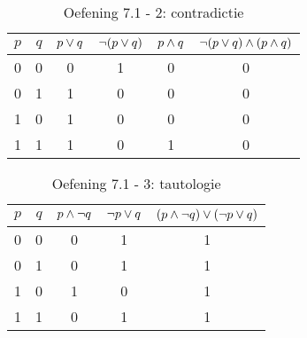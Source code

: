 \begin{oef}
\begin{opl}
\begin{table}[htbp]\footnotesize
\centering
\caption{Oefening 7.1 - 2: contradictie}
\begin{tabular}{cccccc}
\toprule 
$p$ & $q$ & $p\vee q$ & $\neg(p\vee q)$ & $p\wedge q$ & $\neg(p\vee q)\wedge(p\wedge q)$ \\ 
\midrule 
0 & 0 & 0 & 1 & 0 & 0 \\ 
0 & 1 & 1 & 0 & 0 & 0 \\  
1 & 0 & 1 & 0 & 0 & 0 \\  
1 & 1 & 1 & 0 & 1 & 0 \\  
\bottomrule
\end{tabular} 
\label{tab:logica2}
\end{table}

\begin{table}[htbp]\footnotesize
\centering
\caption{Oefening 7.1 - 3: tautologie}
\begin{tabular}{ccccc}
\toprule
$p$ & $q$ & $p\wedge \neg q$ & $\neg p \vee q$ & $(p\wedge \neg q)\vee (\neg p \vee q)$ \\ 
\midrule
0 & 0 & 0 & 1 & 1 \\ 
0 & 1 & 0 & 1 & 1 \\ 
1 & 0 & 1 & 0 & 1 \\  
1 & 1 & 0 & 1 & 1 \\ 
\bottomrule
\end{tabular} 
\label{tab:logica3}
\end{table}
\end{opl}
\end{oef}



